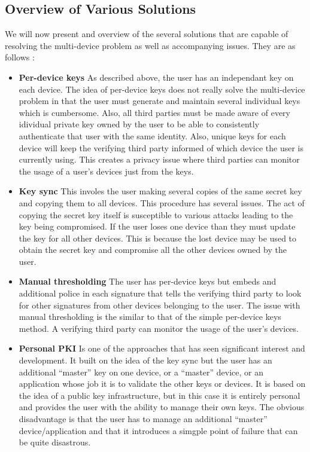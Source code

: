 \subsection{Overview of Various Solutions}
We will now present and overview of the several solutions that are capable of resolving the multi-device problem as well as accompanying issues. They are as follows \cite{Atwater2016}:

\begin{itemize}

	\item \textbf{Per-device keys} As described above, the user has an independant key on each device. The idea of per-device keys does not 				really solve the multi-device problem in that the user must generate and maintain several individual keys which is cumbersome. Also, all third 			parties must be made aware of every idividual private key owned by the user to be able to consistently authenticate that user with the same 			identity. Also, unique keys for each device will keep the verifying third party informed of which device the user is currently using. This creates a 	privacy issue where third parties can monitor the usage of a user's devices just from the keys.\\

	\item \textbf{Key sync} This involes the user making several copies of the same secret key and copying them to all devices. This procedure 			has several issues. The act of copying the secret key itself is susceptible to various attacks leading to the key being compromised. If the user 		loses one device than they must update the key for all other devices. This is because the lost device may be used to obtain the secret key and 		compromise all the other devices owned by the user.\\

	\item \textbf{Manual thresholding} The user has per-device keys but embeds and additional police in each signature that tells the verifying 				third party to look for other signatures from other devices belonging to the user. The issue with manual thresholding is the similar to that of 			the simple per-device keys method. A verifying third party can monitor the usage of the user's devices.\\

	\item \textbf{Personal PKI} Is one of the approaches that has seen significant interest and development. It built on the idea of the key sync 			but the user has an additional ``master'' key on one device, or a ``master'' device, or an application whose job it is to validate the other keys 		or devices. It is based on the idea of a public key infrastructure, but in this case it is entirely personal and provides the user with the 						ability to manage their own keys.  The obvious disadvantage is that the user has to manage an 				additional ``master'' device/application and that it introduces a simgple point of failure that can be quite disastrous.\\


\end{itemize}
